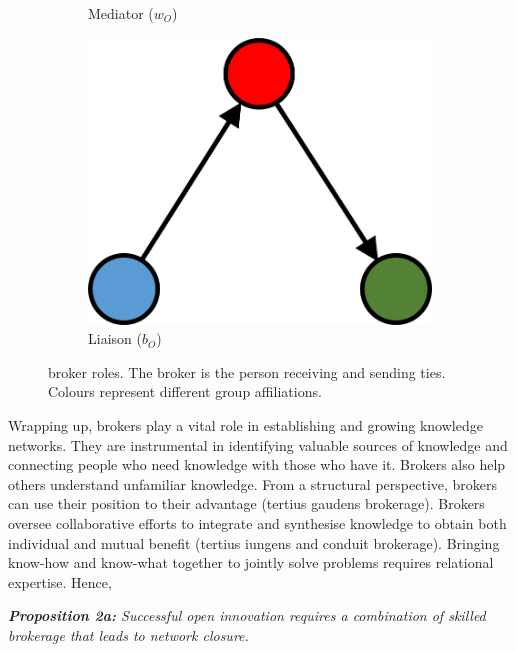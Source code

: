 \begin{figure}
\begin{subfigure}[b]{0.25\textwidth}
    \caption{Mediator ($w_O$)}
    \label{fig:4}
  \end{subfigure}
  \hspace{2em}
  \begin{subfigure}[b]{0.25\textwidth}
    \includegraphics[width=\textwidth]{Images/b_O.png}
    \caption{Liaison ($b_O$)}
    \label{fig:5}
  \end{subfigure}
  \caption[Broker roles]{\citet{gould1989structures} broker roles. The broker is the person receiving and sending ties. Colours represent different group affiliations.}%
    \label{fig:gf_roles}%
\end{figure}

Wrapping up, brokers play a vital role in establishing and growing knowledge networks. They are instrumental in identifying valuable sources of knowledge and connecting people who need knowledge with those who have it. Brokers also help others understand unfamiliar knowledge. From a structural perspective, brokers can use their position to their advantage (tertius gaudens brokerage). Brokers oversee collaborative efforts to integrate and synthesise knowledge to obtain both individual and mutual benefit (tertius iungens and conduit brokerage). Bringing know-how and know-what together to jointly solve problems requires relational expertise. Hence, \bigskip  

\begin{tcolorbox}
\textit{\textbf{Proposition 2a:} Successful open innovation requires a combination of skilled brokerage that leads to network closure.}
\end{tcolorbox}

